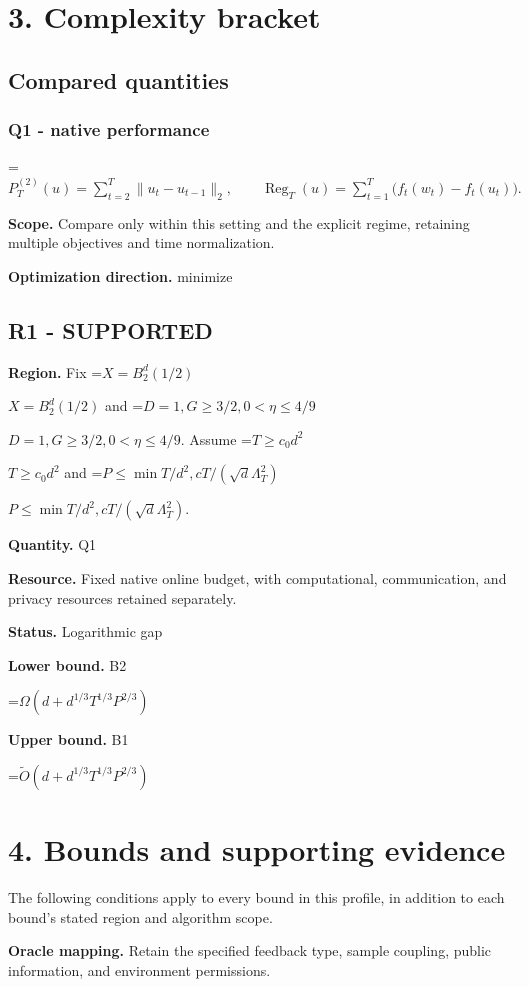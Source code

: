 \documentclass[10pt,a4paper]{article}
\newcommand{\AtlasMath}[1]{\par\begingroup\centering\setbox0=\hbox{$\displaystyle #1$}\ifdim\wd0>1.4\linewidth\typeout{ATLAS WIDE FORMULA: \the\wd0}\fi\ifdim\wd0>\linewidth\resizebox{\linewidth}{!}{\box0}\else\box0\fi\par\endgroup}
\newcommand{\AtlasInlineMath}[1]{\begingroup\setbox0=\hbox{$#1$}\ifdim\wd0>.4\linewidth\endgroup\AtlasMath{#1}\else\endgroup$#1$\fi}
\begin{document}
\section{3. Complexity bracket}
\subsection{Compared quantities}
\subsubsection{Q1 - native performance}
\AtlasMath{P_T^{(2)}(u)=\sum_{t=2}^{T}\|u_t-u_{t-1}\|_2,\qquad \operatorname{Reg}_T(u)=\sum_{t=1}^{T}\bigl(f_t(w_t)-f_t(u_t)\bigr).}
\textbf{Scope.} Compare only within this setting and the explicit regime, retaining multiple objectives and time normalization.

\textbf{Optimization direction.} minimize

\subsection{R1 - SUPPORTED}
\textbf{Region.} Fix \AtlasInlineMath{X=B_2^d(1/2)} and \AtlasInlineMath{D=1,G\ge 3/2,0<\eta\le 4/9}. Assume \AtlasInlineMath{T\ge c_0d^{2}} and \AtlasInlineMath{P\le \min{T/d^{2},cT/(\sqrt{d}\Lambda_T^{2})}}.

\textbf{Quantity.} Q1

\textbf{Resource.} Fixed native online budget, with computational, communication, and privacy resources retained separately.

\textbf{Status.} Logarithmic gap

\textbf{Lower bound.} B2

\AtlasMath{\Omega(d+d^{1/3}T^{1/3}P^{2/3})}
\textbf{Upper bound.} B1

\AtlasMath{\widetilde{O}(d+d^{1/3}T^{1/3}P^{2/3})}
\section{4. Bounds and supporting evidence}
The following conditions apply to every bound in this profile, in addition to each bound's stated region and algorithm scope.

\textbf{Oracle mapping.} Retain the specified feedback type, sample coupling, public information, and environment permissions.
\end{document}
